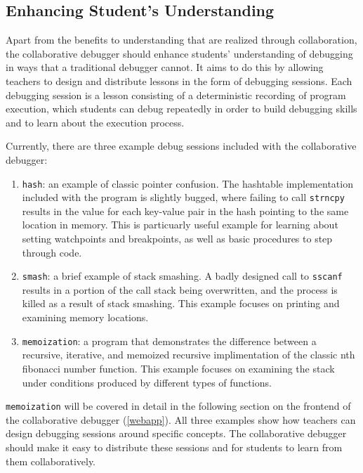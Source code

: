 \documentclass[12pt]{article}
\begin{document}
\subsection{Enhancing Student's Understanding}

Apart from the benefits to understanding that are realized through
collaboration, the collaborative debugger should enhance students'
understanding of debugging in ways that a traditional debugger cannot.
It aims to do this by allowing teachers to design and distribute
lessons in the form of debugging sessions.  Each debugging session is
a lesson consisting of a deterministic recording of program execution,
which students can debug repeatedly in order to build debugging skills
and to learn about the execution process.
\par

Currently, there are three example debug sessions included with the
collaborative debugger:

\begin{enumerate}
\item \lstinline{hash}: an example of classic pointer confusion.  The
  hashtable implementation included with the program is slightly
  bugged, where failing to call \lstinline{strncpy} results in the
  value for each key-value pair in the hash pointing to the same
  location in memory.  This is particuarly useful example for learning
  about setting watchpoints and breakpoints, as well as basic
  procedures to step through code.
\item \lstinline{smash}: a brief example of stack smashing.  A badly
  designed call to \lstinline{sscanf} results in a portion of the call
  stack being overwritten, and the process is killed as a result of
  stack smashing.  This example focuses on printing and examining
  memory locations.
\item \lstinline{memoization}: a program that demonstrates the
  difference between a recursive, iterative, and memoized recursive
  implimentation of the classic nth fibonacci number function.  This
  example focuses on examining the stack under conditions produced by
  different types of functions.
\end{enumerate}

\lstinline{memoization} will be covered in detail in the following
section on the frontend of the collaborative debugger (\ref{webapp}).
All three examples show how teachers can design debugging sessions
around specific concepts.  The collaborative debugger should make it
easy to distribute these sessions and for students to learn from them
collaboratively.
\par
\end{document}
